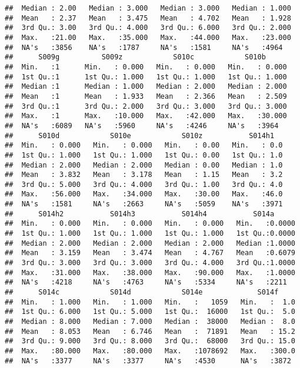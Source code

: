 \documentclass[
]{article}
\begin{document}
\begin{verbatim}
##  Median : 2.00   Median : 3.000   Median : 3.000   Median : 1.000  
##  Mean   : 2.37   Mean   : 3.475   Mean   : 4.702   Mean   : 1.928  
##  3rd Qu.: 3.00   3rd Qu.: 4.000   3rd Qu.: 6.000   3rd Qu.: 2.000  
##  Max.   :21.00   Max.   :35.000   Max.   :44.000   Max.   :23.000  
##  NA's   :3856    NA's   :1787     NA's   :1581     NA's   :4964    
##      S009g          S009z            S010c            S010b       
##  Min.   :1      Min.   : 0.000   Min.   : 0.000   Min.   : 0.000  
##  1st Qu.:1      1st Qu.: 1.000   1st Qu.: 1.000   1st Qu.: 1.000  
##  Median :1      Median : 1.000   Median : 2.000   Median : 2.000  
##  Mean   :1      Mean   : 1.933   Mean   : 2.366   Mean   : 2.509  
##  3rd Qu.:1      3rd Qu.: 2.000   3rd Qu.: 3.000   3rd Qu.: 3.000  
##  Max.   :1      Max.   :10.000   Max.   :42.000   Max.   :30.000  
##  NA's   :6089   NA's   :5960     NA's   :4246     NA's   :3964    
##      S010d            S010e            S010z           S014h1    
##  Min.   : 0.000   Min.   : 0.000   Min.   : 0.00   Min.   : 0.0  
##  1st Qu.: 1.000   1st Qu.: 1.000   1st Qu.: 0.00   1st Qu.: 1.0  
##  Median : 2.000   Median : 2.000   Median : 0.00   Median : 1.0  
##  Mean   : 3.832   Mean   : 3.178   Mean   : 1.15   Mean   : 3.2  
##  3rd Qu.: 5.000   3rd Qu.: 4.000   3rd Qu.: 1.00   3rd Qu.: 4.0  
##  Max.   :56.000   Max.   :34.000   Max.   :30.00   Max.   :46.0  
##  NA's   :1581     NA's   :2663     NA's   :5059    NA's   :3971  
##      S014h2           S014h3           S014h4           S014a       
##  Min.   : 0.000   Min.   : 0.000   Min.   : 0.000   Min.   :0.0000  
##  1st Qu.: 1.000   1st Qu.: 1.000   1st Qu.: 1.000   1st Qu.:0.0000  
##  Median : 2.000   Median : 2.000   Median : 2.000   Median :1.0000  
##  Mean   : 3.159   Mean   : 3.474   Mean   : 4.767   Mean   :0.6079  
##  3rd Qu.: 3.000   3rd Qu.: 3.000   3rd Qu.: 4.000   3rd Qu.:1.0000  
##  Max.   :31.000   Max.   :38.000   Max.   :90.000   Max.   :1.0000  
##  NA's   :4218     NA's   :4763     NA's   :5334     NA's   :2211    
##      S014c            S014d            S014e             S014f      
##  Min.   : 1.000   Min.   : 1.000   Min.   :   1059   Min.   :  1.0  
##  1st Qu.: 6.000   1st Qu.: 5.000   1st Qu.:  16000   1st Qu.:  5.0  
##  Median : 8.000   Median : 7.000   Median :  38000   Median :  8.0  
##  Mean   : 8.053   Mean   : 6.746   Mean   :  71891   Mean   : 15.2  
##  3rd Qu.: 9.000   3rd Qu.: 8.000   3rd Qu.:  68000   3rd Qu.: 15.0  
##  Max.   :80.000   Max.   :80.000   Max.   :1078692   Max.   :300.0  
##  NA's   :3377     NA's   :3377     NA's   :4530      NA's   :3872   

\end{verbatim}
\end{document}
